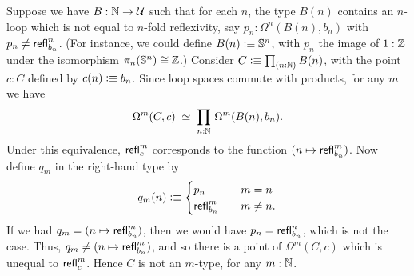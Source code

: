 \documentclass[hott-all.tex]{subfiles}
\begin{document}
% 
% 
% 
\begin{eg}
  Suppose we have $B:\mathbb{N}\to\mathcal{U}$ such that for each $n$, the type $B(n)$ contains an $n$-loop which is not equal to $n$-fold reflexivity, say $p_n:\Omega^n(B(n),b_n)$ with $p_n \neq \mathsf{refl}_{b_n}^n$.
  (For instance, we could define $B(n)\vcentcolon\equiv \mathbb{S}^n$, with $p_n$ the image of $1:\mathbb{Z}$ under the isomorphism $\pi_n(\mathbb{S}^n)\cong \mathbb{Z}$.)
  Consider $C\defeq \prd{n:\nat} B(n)$, with the point $c:C$ defined by $c(n)\vcentcolon\equiv b_n$.
  Since loop spaces commute with products, for any $m$ we have
  \[\eqvspaced{\Omega^m (C,c)}{\prd{n:\nat}\Omega^m(B(n),b_n)}.\]
  Under this equivalence, $\mathsf{refl}_{c}^m$ corresponds to the function $(n\mapsto \mathsf{refl}_{b_n}^m)$.
  Now define $q_m$ in the right-hand type by
  \[ q_m(n) \vcentcolon\equiv
  \begin{cases}
    p_n &\quad m=n\\
    \mathsf{refl}_{b_n}^m &\quad m\neq n.
  \end{cases}
  \]
  If we had $q_m = (n\mapsto \mathsf{refl}_{b_n}^m)$, then we would have $p_n = \mathsf{refl}_{b_n}^n$, which is not the case.
  Thus, $q_m \neq (n\mapsto \mathsf{refl}_{b_n}^m)$, and so there is a point of $\Omega^m(C,c)$ which is unequal to $\mathsf{refl}_{c}^m$.
  Hence $C$ is not an $m$-type, for any $m:\mathbb{N}$.
\end{eg}
% 
% 
\end{document}
